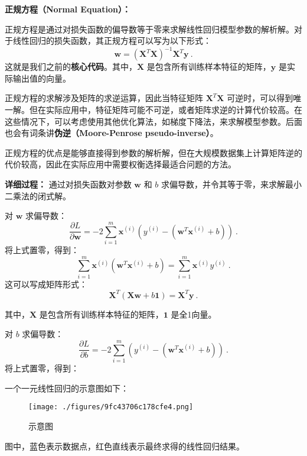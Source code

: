 \textbf{正规方程（Normal Equation）：}

正规方程是通过对损失函数的偏导数等于零来求解线性回归模型参数的解析解。对于线性回归的损失函数，其正规方程可以写为以下形式：
\begin{equation}
\mathbf{w} = (\mathbf{X}^T \mathbf{X})^{-1} \mathbf{X}^T \mathbf{y}~.
\end{equation}
这就是我们之前的\textbf{核心代码}。其中，$\mathbf{X}$ 是包含所有训练样本特征的矩阵，$\mathbf{y}$ 是实际输出值的向量。

正规方程的求解涉及矩阵的求逆运算，因此当特征矩阵 $\mathbf{X}^T \mathbf{X}$ 可逆时，可以得到唯一解。但在实际应用中，特征矩阵可能不可逆，或者矩阵求逆的计算代价较高。在这些情况下，可以考虑使用其他优化算法，如梯度下降法，来求解模型参数。后面也会有词条讲\textbf{伪逆（Moore-Penrose pseudo-inverse）}。

正规方程的优点是能够直接得到参数的解析解，但在大规模数据集上计算矩阵逆的代价较高，因此在实际应用中需要权衡选择最适合问题的方法。

\begin{example}{\textbf{详细过程：}
通过对损失函数对参数 $\mathbf{w}$ 和 $b$ 求偏导数，并令其等于零，来求解最小二乘法的闭式解。}

对 $\mathbf{w}$ 求偏导数：
\begin{equation}
\frac{\partial L}{\partial \mathbf{w}} = -2 \sum_{i=1}^{m} \mathbf{x}^{(i)} (y^{(i)} - (\mathbf{w}^T \mathbf{x}^{(i)} + b))~.
\end{equation}
将上式置零，得到：
\begin{equation}
\sum_{i=1}^{m} \mathbf{x}^{(i)} (\mathbf{w}^T \mathbf{x}^{(i)} + b) = \sum_{i=1}^{m} \mathbf{x}^{(i)} y^{(i)}~.
\end{equation}
这可以写成矩阵形式：
\begin{equation}
\mathbf{X}^T (\mathbf{X} \mathbf{w} + b\mathbf{1}) = \mathbf{X}^T \mathbf{y}~.
\end{equation}

其中，$\mathbf{X}$ 是包含所有训练样本特征的矩阵，$\mathbf{1}$ 是全1向量。

对 $b$ 求偏导数：
\begin{equation}
\frac{\partial L}{\partial b} = -2 \sum_{i=1}^{m} (y^{(i)} - (\mathbf{w}^T \mathbf{x}^{(i)} + b))~.
\end{equation}
将上式置零，得到：
\end{example}

一个一元线性回归的示意图如下：
\begin{figure}[ht]
\centering
\texttt{[image: ./figures/9fc43706c178cfe4.png]}
\caption{示意图} \label{fig_LiGr_1}
\end{figure}
图中，蓝色表示数据点，红色直线表示最终求得的线性回归结果。

